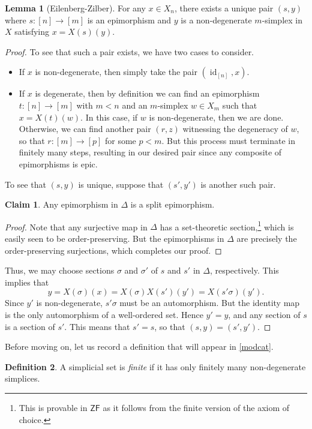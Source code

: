 \documentclass[10pt,letterpaper,cm]{nupset}
\theoremstyle{definition}
\newtheorem{definition}{Definition}[subsection]
\theoremstyle{theorem}
\newtheorem{lemma}[definition]{Lemma}
\newtheorem*{claim}{Claim}
\theoremstyle{remark}
\newcommand{\0}{\mathbf{0}}
\newcommand{\1}{\mathbf{1}}
\newcommand{\2}{\mathbf{2}}
\DeclareMathOperator{\idd}{id}
\newcommand{\bi}{\begin{itemize}}
\newcommand{\ei}{\end{itemize}}
\begin{document}
\begin{lemma}[Eilenberg-Zilber]\label{E-Z}
For any $x\in X_n$, there exists a unique pair $\left(s, y\right)$ where $s: \left[n\right] \to \left[m\right]$ is an epimorphism and $y $ is a non-degenerate $m$-simplex in $X$ satisfying $x= X(s)(y)$.
\end{lemma}
\begin{proof}
To see that such a pair exists, we have two cases to consider.
\bi
\item If $x$ is non-degenerate, then simply take the pair $\left(\idd_{\left[n\right]}, x\right)$.
\item If $x$ is degenerate, then by definition we can find  an epimorphism $t: \left[n\right] \to \left[m\right]$ with $m<n$ and an $m$-simplex $w\in X_m$ such that $x= X(t)(w)$. In this case, if $w$ is non-degenerate, then we are done. Otherwise, we can find another pair $\left(r, z\right)$ witnessing the degeneracy of $w$, so that $r : \left[m\right] \to \left[p\right]$ for some $p<m$. But this process must terminate in finitely many steps, resulting in our desired pair since any composite of epimorphisms is epic.
\ei
To see that $\left(s,y\right)$ is unique, suppose that $\left(s', y'\right)$ is another such pair. 
\begin{claim}
Any epimorphism in $\varDelta$ is a split epimorphism.
\end{claim}
\begin{proof}
Note that any surjective map in $\varDelta$ has a set-theoretic section,\footnote{This is provable in $\mathsf{ZF}$ as it follows from the finite version of the axiom of choice.} which is easily seen to be order-preserving. But the epimorphisms in $\varDelta$ are precisely the order-preserving surjections, which completes our proof.
\end{proof}
Thus, we may choose sections $\sigma$ and $\sigma'$ of $s$ and $s'$ in $\varDelta$, respectively.  This implies that 
\[
y = X(\sigma)(x) = X(\sigma)X(s')(y') = X(s'\sigma)(y').
\] Since $y'$ is non-degenerate, $s'{\sigma}$ must be an automorphism. But the identity map is the only  automorphism of a well-ordered set. Hence $y' = y$, and any section of $s$ is a section of $s'$. This means that $s' = s$, so that $\left(s, y\right) = \left(s', y'\right)$.
\end{proof}

\smallskip

Before moving on, let us record a definition that will appear in \cref{modcat}.

\begin{definition}\label{finsimp}
A simplicial set is \textit{finite} if it has only finitely many non-degenerate simplices.
\end{definition}
\end{document}
